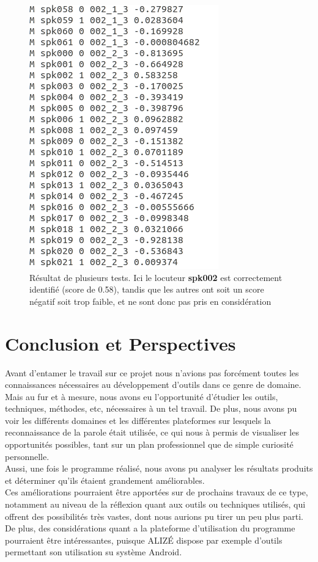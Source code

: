 \documentclass[a4paper, 12pt]{book}
\newcounter{program}[subsection]
\begin{document}
\begin{figure}[htbp]
  \centering
  \includegraphics[width=0.5\linewidth]{images/badResultExample.png}
  \caption{Résultat de plusieurs tests. Ici le locuteur \textbf{spk002} est correctement identifié (score de 0.58), tandis que les autres ont soit un score négatif soit trop faible, et ne sont donc pas pris en considération}
\end{figure}


\chapter{Conclusion et Perspectives\label{chap-conclusion}}

Avant d'entamer le travail sur ce projet nous n'avions pas forcément toutes les connaissances nécessaires au développement d'outils dans ce genre de domaine.
Mais au fur et à mesure, nous avons eu l'opportunité d'étudier les outils, techniques, méthodes, etc, nécessaires à un tel travail.
De plus, nous avons pu voir les différents domaines et les différentes plateformes sur lesquels la reconnaissance de la parole était utilisée, ce qui nous à permis de visualiser les opportunités possibles, tant sur un plan professionnel que de simple curiosité personnelle.\\

Aussi, une fois le programme réalisé, nous avons pu analyser les résultats produits et déterminer qu'ils étaient grandement améliorables.\\

Ces améliorations pourraient être apportées sur de prochains travaux de ce type, notamment au niveau de la réflexion quant aux outils ou techniques utilisés, qui offrent des possibilités très vastes, dont nous aurions pu tirer un peu plus parti. De plus, des considérations quant a la plateforme d'utilisation du programme pourraient être intéressantes, puisque ALIZÉ dispose par exemple d'outils permettant son utilisation su système Android.
\end{document}
